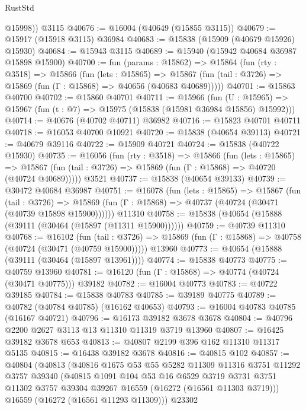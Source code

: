 \begin{lexlean}{RustStd}
\begin{coremodule}
        @15998))
    @3115
@40676 := @16004 (@40649 (@15855 @3115))
@40679 := @15917 (@15918 @3115) @36984
@40683 := @15838 (@15909 (@40679 @15926) @15930)
@40684 := @15943 @3115
@40689 := @15940 (@15942 @40684 @36987 @15898 @15900)
@40700 := fun (params : @15862) =>
  @15864
    (fun (rty : @3518) =>
    @15866
      (fun (lets : @15865) =>
      @15867 (fun (tail : @3726) => @15869 (fun (Γ : @15868) => @40656 (@40683 @40689)))))
@40701 := @15863 @40700
@40702 := @15860 @40701
@40711 := @15966
    (fun (U : @15965) => @15967 (fun (t : @7) => @15975 (@15838 (@15981 @36984 @15856) @15992)))
@40714 := @40676 (@40702 @40711) @36982
@40716 := @15823 @40701 @40711
@40718 := @16053 @40700 @10921
@40720 := @15838 (@40654 @39113)
@40721 := @40679 @39116
@40722 := @15909 @40721
@40724 := @15838 (@40722 @15930)
@40735 := @16056
    (fun (rty : @3518) =>
    @15866
      (fun (lets : @15865) =>
      @15867 (fun (tail : @3726) => @15869 (fun (Γ : @15868) => @40720 (@40724 @40689)))))
    @3521
@40737 := @15838 (@40654 @39133)
@40739 := @30472 @40684 @36987
@40751 := @16078
    (fun (lets : @15865) =>
    @15867
      (fun (tail : @3726) =>
      @15869 (fun (Γ : @15868) => @40737 (@40724 (@30471 (@40739 @15898 @15900))))))
    @11310
@40758 := @15838 (@40654 (@15888 (@39111 (@30464 (@15897 (@11311 @15900))))))
@40759 := @40739 @11310
@40768 := @16102
    (fun (tail : @3726) => @15869 (fun (Γ : @15868) => @40758 (@40724 (@30471 (@40759 @15900)))))
    @13960
@40773 := @40654 (@15888 (@39111 (@30464 (@15897 @13961))))
@40774 := @15838 @40773
@40775 := @40759 @13960
@40781 := @16120 (fun (Γ : @15868) => @40774 (@40724 (@30471 @40775))) @39182
@40782 := @16004 @40773
@40783 := @40722 @39185
@40784 := @15838 @40783
@40785 := @39189 @40775
@40789 := @40782 (@40784 @40785) (@16162 @40653)
@40793 := @16004 @40783 @40785 (@16167 @40721)
@40796 := @16173 @39182 @3678 @3678
@40804 := @40796 @2200 @2627 @3113 @13 @11310 @11319 @3719 @13960
@40807 := @16425 @39182 @3678 @653
@40813 := @40807 @2199 @396 @162 @11310 @11317 @5135
@40815 := @16438 @39182 @3678
@40816 := @40815 @102
@40857 := @40804
    (@40813
      (@40816
        @1675
        @53
        @55
        @5282
        @11309
        @11316
        @3751
        @11292
        @3757
        @39340
        (@40815
          @1091
          @104
          @53
          @16
          @6529
          @3719
          @3731
          @3751
          @11302
          @3757
          @39304
          @39267
          @16559
          (@16272 (@16561 @11303 @3719)))
        @16559
        (@16272 (@16561 @11293 @11309)))
      @23302

\end{coremodule}
\end{lexlean}
